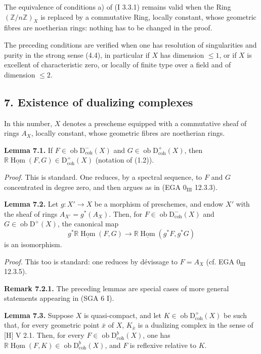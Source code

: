 \documentclass[11pt]{article}
\DeclareMathOperator{\Hom}{Hom}
\newcommand{\D}{\mathrm{D}}
\newcommand{\Z}{\mathbb{Z}}
\newcommand{\ob}{\operatorname{ob}}
\providecommand{\Hom}{\operatorname{Hom}}
\providecommand{\ob}{\operatorname{ob}}
\providecommand{\Z}{\mathbb Z}
\providecommand{\Hom}{\operatorname{Hom}}
\begin{document}
The equivalence of conditions a) of (I 3.3.1) remains valid when the Ring $(\Z/n\Z)_X$ is replaced by a commutative Ring, locally constant, whose geometric fibres are noetherian rings: nothing has to be changed in the proof.

The preceding conditions are verified when one has resolution of singularities and purity in the strong sense (4.4), in particular if $X$ has dimension $\leq1$, or if $X$ is excellent of characteristic zero, or locally of finite type over a field and of dimension $\leq2$.

\subsection*{7. Existence of dualizing complexes}

In this number, $X$ denotes a prescheme equipped with a commutative sheaf of rings $A_X$, locally constant, whose geometric fibres are noetherian rings.

\textbf{Lemma 7.1.} If $F\in\ob\D^{-}_{\mathrm{coh}}(X)$ and $G\in\ob\D^{+}_{\mathrm{coh}}(X)$, then $\mathbb{R}\underline{\Hom}(F,G)\in\D^{+}_{\mathrm{coh}}(X)$ (notation of (1.2)).

\emph{Proof.} This is standard. One reduces, by a spectral sequence, to $F$ and $G$ concentrated in degree zero, and then argues as in (EGA $0_{\mathrm{III}}$ 12.3.3).

\textbf{Lemma 7.2.} Let $g:X'\to X$ be a morphism of preschemes, and endow $X'$ with the sheaf of rings $A_{X'}=g^*(A_X)$. Then, for $F\in\ob\D^{-}_{\mathrm{coh}}(X)$ and $G\in\ob\D^{+}(X)$, the canonical map
\[
        g^*\mathbb{R}\underline{\Hom}(F,G)\longrightarrow \mathbb{R}\underline{\Hom}(g^*F,g^*G)
\]
is an isomorphism.

\emph{Proof.} This too is standard: one reduces by dévissage to $F=A_X$ (cf. EGA $0_{\mathrm{III}}$ 12.3.5).

\textbf{Remark 7.2.1.} The preceding lemmas are special cases of more general statements appearing in (SGA 6 I).

\textbf{Lemma 7.3.} Suppose $X$ is quasi-compact, and let $K\in\ob\D^{+}_{\mathrm{coh}}(X)$ be such that, for every geometric point $\bar{x}$ of $X$, $K_{\bar{x}}$ is a dualizing complex in the sense of [H] V 2.1. Then, for every $F\in\ob\D^{b}_{\mathrm{coh}}(X)$, one has $\mathbb{R}\underline{\Hom}(F,K)\in\ob\D^{b}_{\mathrm{coh}}(X)$, and $F$ is reflexive relative to $K$.
\end{document}
